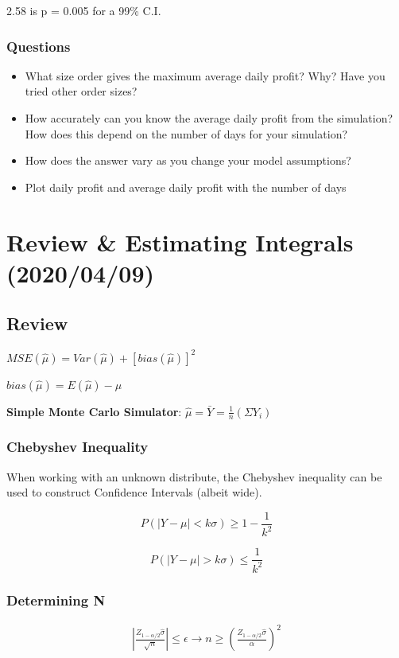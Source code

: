 \documentclass[11pt]{article}
\begin{document}
2.58 is p = 0.005 for a 99\% C.I.

\subsubsection{Questions}
\label{sec:orgc5e99a4}
\begin{itemize}
\item What size order gives the maximum average daily profit? Why? Have you tried
other order sizes?
\item How accurately can you know the average daily profit from the simulation? How
does this depend on the number of days for your simulation?
\item How does the answer vary as you change your model assumptions?
\item Plot daily profit and average daily profit with the number of days
\end{itemize}
\section{Review \& Estimating Integrals (2020/04/09)}
\label{sec:org34ebb15}
\subsection{Review}
\label{sec:org3bdbeae}

\(MSE(\hat \mu) = Var(\hat \mu) + [bias(\hat \mu)]^2\)

\(bias(\hat \mu) = E(\hat \mu) - \mu\)

\textbf{Simple Monte Carlo Simulator}: \(\hat \mu = \bar Y = \frac{1}{n} (\Sigma Y_i)\)

\subsubsection{Chebyshev Inequality}
\label{sec:org6fc995e}

When working with an unknown distribute, the Chebyshev inequality can
be used to construct Confidence Intervals (albeit wide).

$$
P(|Y - \mu| < k \sigma) \geq 1 - \frac{1}{k^2}
$$

$$
P(|Y - \mu| > k \sigma) \leq \frac{1}{k^2}
$$

\subsubsection{Determining N}
\label{sec:org80a6377}

\begin{equation}
\begin{split}
|\frac{Z_{1 - \alpha/2} \hat \sigma}{\sqrt{n}}| \leq \epsilon \to n \geq (\frac{Z_{1 - \alpha/2}\hat \sigma}{\alpha})^2
\end{split}
\end{equation}
\end{document}
